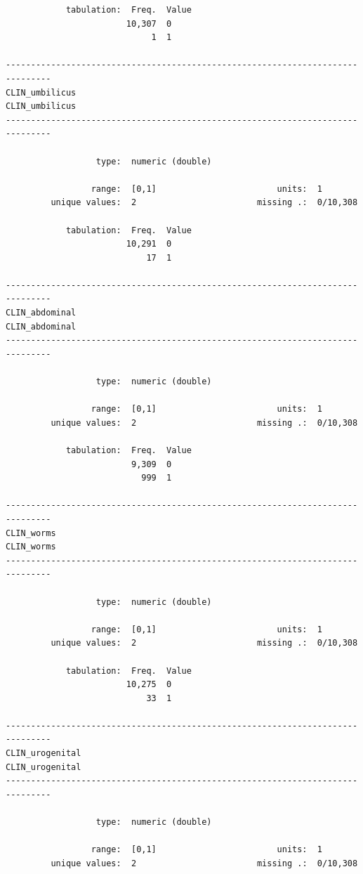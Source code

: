 \documentclass[
  letterpaper,
  DIV=11,
  numbers=noendperiod]{scrreprt}
\begin{document}
\begin{verbatim}
            tabulation:  Freq.  Value
                        10,307  0
                             1  1

-------------------------------------------------------------------------------
CLIN_umbilicus                                                   CLIN_umbilicus
-------------------------------------------------------------------------------

                  type:  numeric (double)

                 range:  [0,1]                        units:  1
         unique values:  2                        missing .:  0/10,308

            tabulation:  Freq.  Value
                        10,291  0
                            17  1

-------------------------------------------------------------------------------
CLIN_abdominal                                                   CLIN_abdominal
-------------------------------------------------------------------------------

                  type:  numeric (double)

                 range:  [0,1]                        units:  1
         unique values:  2                        missing .:  0/10,308

            tabulation:  Freq.  Value
                         9,309  0
                           999  1

-------------------------------------------------------------------------------
CLIN_worms                                                           CLIN_worms
-------------------------------------------------------------------------------

                  type:  numeric (double)

                 range:  [0,1]                        units:  1
         unique values:  2                        missing .:  0/10,308

            tabulation:  Freq.  Value
                        10,275  0
                            33  1

-------------------------------------------------------------------------------
CLIN_urogenital                                                 CLIN_urogenital
-------------------------------------------------------------------------------

                  type:  numeric (double)

                 range:  [0,1]                        units:  1
         unique values:  2                        missing .:  0/10,308


\end{verbatim}
\end{document}
